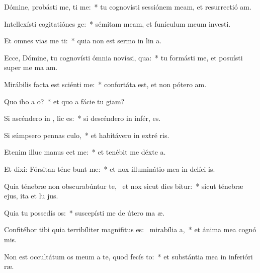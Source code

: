 \item Dómine, probásti me,  ti me:~* tu cognovísti sessiónem meam, et resurrectió am.
\item Intellexísti cogitatiónes   ge:~* sémitam meam, et funículum meum investi.
\item Et omnes vias me ti:~* quia non est sermo in lin a.
\item Ecce, Dómine, tu cognovísti ómnia novíssi,  qua:~* tu formásti me, et posuísti super me ma am.
\item Mirábilis facta est sciénti   me:~* confortáta est, et non pótero  am.
\item Quo ibo a  o?~* et quo a fácie tu giam?
\item Si ascéndero in ,  lic es:~* si descéndero in infér, es.
\item Si súmpsero pennas  culo,~* et habitávero in extré ris.
\item Etenim illuc manus  cet me:~* et tenébit me déxte a.
\item Et dixi: Fórsitan téne bunt me:~* et nox illuminátio mea in delíci is.
\item Quia ténebræ non obscurabúntur  te,~\pscross{} et nox sicut dies bitur:~* sicut ténebræ ejus, ita et lu jus.
\item Quia tu possedís  os:~* suscepísti me de útero ma æ.
\item Confitébor tibi quia terribíliter magnifitus es:~\pscross{} mirabília  a,~* et ánima mea cognó mis.
\item Non est occultátum os meum a te, quod fecís  to:~* et substántia mea in inferióri ræ.
